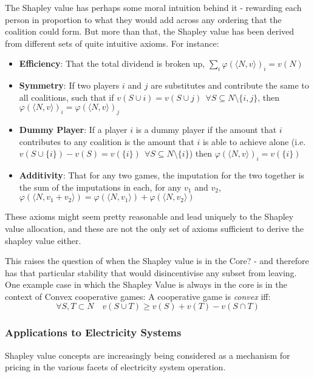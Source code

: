 The Shapley value has perhaps some moral intuition behind it - rewarding each person in proportion to what they would add across any ordering that the coalition could form.
But more than that, the Shapley value has been derived from different sets of quite intuitive axioms.
For instance:

\begin{itemize}
\item	\textbf{Efficiency}: That the total dividend is broken up, $\sum_i\varphi(\langle N,v\rangle)_i = v(N)$
\item	\textbf{Symmetry}: If two players $i$ and $j$ are substitutes and contribute the same to all coalitions, such that if $v(S\cup i)=v(S\cup j)~~\forall S\subseteq N\setminus\{i,j\}$, then $\varphi(\langle N,v\rangle)_i = \varphi(\langle N,v\rangle)_j$
\item	\textbf{Dummy Player}: If a player $i$ is a dummy player if the amount that $i$ contributes to any coalition is the amount that $i$ is able to achieve alone (i.e.\ $v(S\cup \{i\})-v(S)=v(\{i\})~~\forall S\subseteq N\setminus\{i\}$) then $\varphi(\langle N,v\rangle)_i=v(\{i\})$
\item	\textbf{Additivity}: That for any two games, the imputation for the two together is the sum of the imputations in each, for any $v_1$ and $v_2$, $\varphi(\langle N,v_1+v_2\rangle)=\varphi(\langle N,v_1 \rangle) + \varphi(\langle N,v_2\rangle)$
\end{itemize}

These axioms might seem pretty reasonable and lead uniquely to the Shapley value allocation, and these are not the only set of axioms sufficient to derive the shapley value either.

This raises the question of when the Shapley value is in the Core? - and therefore has that particular stability that would disincentivise any subset from leaving.
One example case in which the Shapley Value is always in the core is in the context of Convex cooperative games:
A cooperative game is \textit{convex} iff:
\begin{equation}
    \forall S,T\subset N \quad v(S\cup T) \ge v(S)+v(T)-v(S\cap T)
\end{equation}

\subsubsection{Applications to Electricity Systems}

Shapley value concepts are increasingly being considered as a mechanism for pricing in the various facets of electricity system operation.

